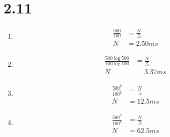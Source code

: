 \documentclass{article}
\begin{document}
\section*{2.11}
    \begin{enumerate}
        \item
            \begin{equation*} 
            \begin{split}
                \frac{500}{100} & = \frac{N}{.5}\\
                N & = 2.50 ms
            \end{split}
            \end{equation*}
        \item 
            \begin{equation*}
            \begin{split}
                \frac{500\log{500}}{100\log{100}} & = \frac{N}{.5}\\
                N & = 3.37 ms
            \end{split}
            \end{equation*}
        \item
            \begin{equation*} 
            \begin{split}
                \frac{500^2}{100^2} & = \frac{N}{.5}\\
                N & = 12.5 ms
            \end{split}
            \end{equation*}
        \item
            \begin{equation*} 
            \begin{split}
                \frac{500^3}{100^3} & = \frac{N}{.5}\\
                N & = 62.5 ms
            \end{split}
            \end{equation*}
    \end{enumerate}
\end{document}
